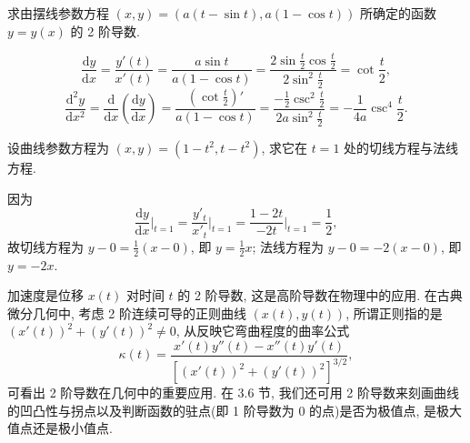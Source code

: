 \begin{example}\label{ex:3.2.11}
求由摆线参数方程 $(x, y) = (a(t - \sin t), a(1 - \cos t))$ 所确定的函数 $y = y(x)$ 的 2 阶导数.
\end{example}

\begin{solution}
\[
\frac{\mathrm{d}y}{\mathrm{d}x} = \frac{y'(t)}{x'(t)} = \frac{a\sin t}{a(1 - \cos t)} = \frac{2\sin\frac{t}{2}\cos\frac{t}{2}}{2\sin^{2}\frac{t}{2}} = \cot\frac{t}{2},
\]
\[
\frac{\mathrm{d}^{2}y}{\mathrm{d}x^{2}} = \frac{\mathrm{d}}{\mathrm{d}x}\left(\frac{\mathrm{d}y}{\mathrm{d}x}\right) = \frac{\left(\cot\frac{t}{2}\right)'}{a(1 - \cos t)} = \frac{-\frac{1}{2}\csc^{2}\frac{t}{2}}{2a\sin^{2}\frac{t}{2}} = -\frac{1}{4a}\csc^{4}\frac{t}{2}.
\]
\end{solution}

\begin{example}\label{ex:3.2.12}
设曲线参数方程为 $(x, y) = (1 - t^{2}, t - t^{2})$, 求它在 $t = 1$ 处的切线方程与法线方程.
\end{example}

\begin{solution}
因为
\[
\frac{\mathrm{d}y}{\mathrm{d}x}\bigg|_{t=1} = \frac{y'_{t}}{x'_{t}}\bigg|_{t=1} = \frac{1 - 2t}{-2t}\bigg|_{t=1} = \frac{1}{2},
\]
故切线方程为 $y - 0 = \frac{1}{2}(x - 0)$, 即 $y = \frac{1}{2}x$; 法线方程为 $y - 0 = -2(x - 0)$, 即 $y = -2x$.
\end{solution}

\begin{remark}\label{rem:3.2.2}
加速度是位移 $x(t)$ 对时间 $t$ 的 2 阶导数, 这是高阶导数在物理中的应用. 在古典微分几何中, 考虑 2 阶连续可导的正则曲线 $(x(t), y(t))$, 所谓正则指的是 $(x'(t))^{2} + (y'(t))^{2} \neq 0$, 从反映它弯曲程度的曲率公式
\[
\kappa(t) = \frac{x'(t)y''(t) - x''(t)y'(t)}{\left[(x'(t))^{2} + (y'(t))^{2}\right]^{3/2}},
\]
可看出 2 阶导数在几何中的重要应用. 在 3.6 节, 我们还可用 2 阶导数来刻画曲线的凹凸性与拐点以及判断函数的驻点(即 1 阶导数为 0 的点)是否为极值点, 是极大值点还是极小值点.
\end{remark}

